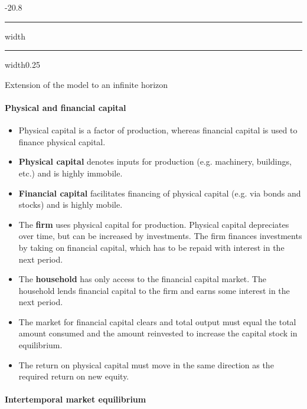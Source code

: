 \documentclass[a4paper,landscape,7pt,fleqn]{scrartcl}
\makeatletter
\renewcommand{\emph}[1]{\textbf{#1}}
\renewcommand{\subsection}{\@startsection{subsection}{1}{0mm}%
{-2\baselineskip}{0.8\baselineskip}%
{\hrule depth 0.2pt width\columnwidth\hrule depth0.75pt
width0.25\columnwidth\vspace*{1.2em}\large\bfseries}}
\makeatother
\begin{document}
\begin{multicols*}{3}
\subsection{Extension of the model to an infinite horizon}

\paragraph{Physical and financial capital}
\begin{itemize}
\item Physical capital is a factor of production, whereas financial capital is used to finance physical capital.
\item \emph{Physical capital} denotes inputs for production (e.g. machinery, buildings, etc.) and is highly immobile.
\item \emph{Financial capital} facilitates financing of physical capital (e.g. via bonds and stocks) and is highly mobile.
\item The \emph{firm} uses physical capital for production. Physical capital depreciates over time, but can be increased by investments. The firm finances investments by taking on financial capital, which has to be repaid with interest in the next period.
\item The \emph{household} has only access to the financial capital market. The household lends financial capital to the firm and earns some interest in the next period.
\item The market for financial capital clears and total output must equal the total amount consumed and the amount reinvested to increase the capital stock in equilibrium.
\item The return on physical capital must move in the same direction as the required return on new equity.
\end{itemize}

\paragraph{Intertemporal market equilibrium}


\end{multicols*}
\end{document}
